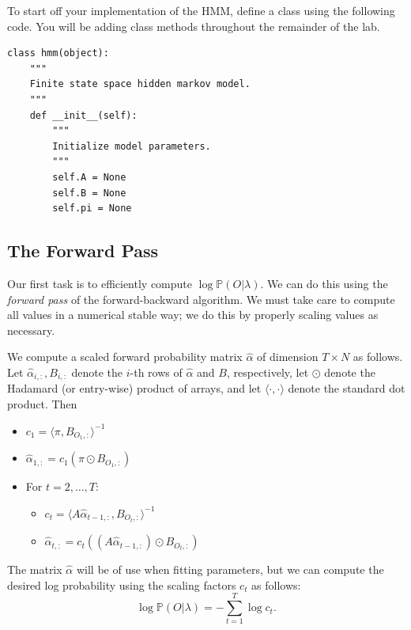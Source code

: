 \begin{problem}
To start off your implementation of the HMM, define a class using the following code.
You will be adding class methods throughout the remainder of the lab.
\begin{lstlisting}
class hmm(object):
    """
    Finite state space hidden markov model.
    """
    def __init__(self):
        """
        Initialize model parameters.
        """
        self.A = None
        self.B = None
        self.pi = None
\end{lstlisting}
\end{problem}
\subsection*{The Forward Pass}
Our first task is to efficiently compute $\log \mathbb{P}(O | \lambda)$.
We can do this using the \emph{forward pass} of the forward-backward algorithm.
We must take care to compute all values in a numerical stable way; we do this by properly scaling values as necessary.

We compute a scaled forward probability matrix $\widehat{\alpha}$ of dimension $T \times N$ as follows.
Let $\widehat{\alpha}_{i,:}, B_{i,:}$ denote the $i$-th rows of $\widehat{\alpha}$ and $B$, respectively, let $\odot$ denote the Hadamard (or entry-wise) product of arrays,
and let $\langle \cdot, \cdot \rangle$ denote the standard dot product.
Then
\begin{itemize}
 \item $c_1 = \langle \pi, B_{O_1,:}\rangle^{-1}$
 \item $\widehat{\alpha}_{1,:} = c_1(\pi\odot B_{O_1,:})$
 \item For $t = 2, \ldots, T$:
 \begin{itemize}[]
     \item $c_t = \langle A\widehat{\alpha}_{t-1,:}, B_{O_t,:}\rangle^{-1}$
	 \item $\widehat{\alpha}_{t,:} = c_t((A\widehat{\alpha}_{t-1,:})\odot B_{O_t,:})$
 \end{itemize}
\end{itemize}
The matrix $\widehat{\alpha}$ will be of use when fitting parameters, but we can compute the desired log probability using the scaling factors $c_t$ as follows:
\[
\log \mathbb{P}(O | \lambda) = -\sum_{t=1}^T \log c_t.
\]

